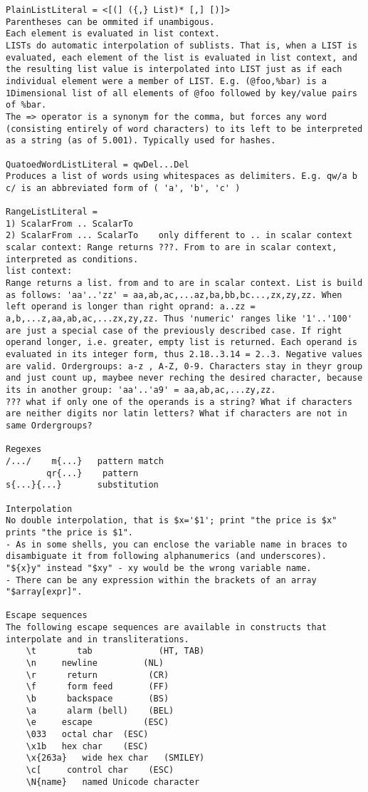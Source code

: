 \documentclass{article}
\begin{document}
\begin{description}
{\begin{verbatim}
PlainListLiteral = <[(] ({,} List)* [,] [)]>
Parentheses can be ommited if unambigous. 
Each element is evaluated in list context.
LISTs do automatic interpolation of sublists. That is, when a LIST is evaluated, each element of the list is evaluated in list context, and the resulting list value is interpolated into LIST just as if each individual element were a member of LIST. E.g. (@foo,%bar) is a 1Dimensional list of all elements of @foo followed by key/value pairs of %bar.
The => operator is a synonym for the comma, but forces any word (consisting entirely of word characters) to its left to be interpreted as a string (as of 5.001). Typically used for hashes.

QuatoedWordListLiteral = qwDel...Del    
Produces a list of words using whitespaces as delimiters. E.g. qw/a b c/ is an abbreviated form of ( 'a', 'b', 'c' )

RangeListLiteral = 
1) ScalarFrom .. ScalarTo
2) ScalarFrom ... ScalarTo    only different to .. in scalar context
scalar context: Range returns ???. From to are in scalar context, interpreted as conditions.
list context:
Range returns a list. from and to are in scalar context. List is build as follows: 'aa'..'zz' = aa,ab,ac,...az,ba,bb,bc...,zx,zy,zz. When left operand is longer than right oprand: a..zz = a,b,...z,aa,ab,ac,...zx,zy,zz. Thus 'numeric' ranges like '1'..'100' are just a special case of the previously described case. If right operand longer, i.e. greater, empty list is returned. Each operand is evaluated in its integer form, thus 2.18..3.14 = 2..3. Negative values are valid. Ordergroups: a-z , A-Z, 0-9. Characters stay in theyr group and just count up, maybee never reching the desired character, because its in another group: 'aa'..'a9' = aa,ab,ac,...zy,zz. 
??? what if only one of the operands is a string? What if characters are neither digits nor latin letters? What if characters are not in same Ordergroups?

Regexes
/.../    m{...}   pattern match
        qr{...}    pattern
s{...}{...}       substitution

Interpolation
No double interpolation, that is $x='$1'; print "the price is $x" prints "the price is $1". 
- As in some shells, you can enclose the variable name in braces to disambiguate it from following alphanumerics (and underscores). "${x}y" instead "$xy" - xy would be the wrong variable name.
- There can be any expression within the brackets of an array "$array[expr]".

Escape sequences
The following escape sequences are available in constructs that interpolate and in transliterations.
    \t        tab             (HT, TAB)
    \n     newline         (NL)
    \r      return          (CR)
    \f      form feed       (FF)
    \b      backspace       (BS)
    \a      alarm (bell)    (BEL)
    \e     escape          (ESC)
    \033   octal char  (ESC)
    \x1b   hex char    (ESC)
    \x{263a}   wide hex char   (SMILEY)
    \c[     control char    (ESC)
    \N{name}   named Unicode character


\end{verbatim}}
\end{description}
\end{document}
